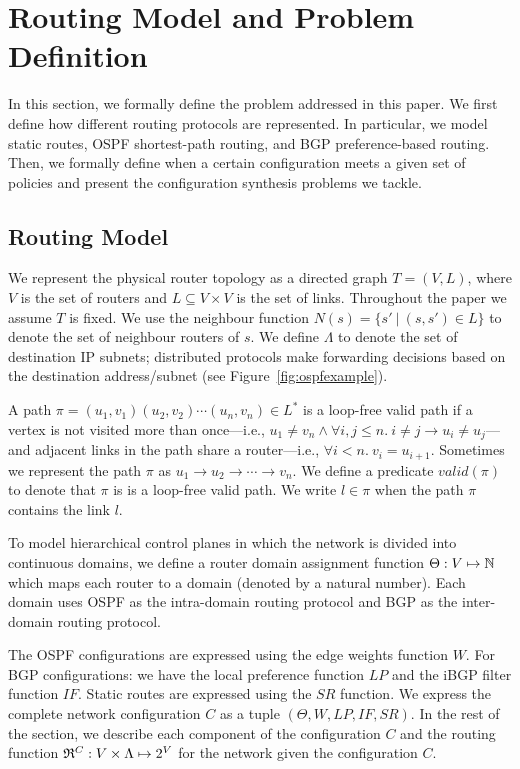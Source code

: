 \section{Routing Model and Problem Definition}
In this section, we formally define the problem addressed in this
paper.  We first define how different
routing protocols are represented.  In particular, we model static
routes, OSPF shortest-path routing, and BGP preference-based routing.
Then, we formally define when a certain configuration meets a given
set of policies and present the configuration synthesis problems
we tackle.

\subsection{Routing Model}

We represent the physical router topology as a directed graph $T=(V, L)$,
where $V$ is the set of routers and $L\subseteq V\times V$ is the set of links. 
Throughout the paper we assume $T$ is fixed.
We use the neighbour function $N(s) = \{s'\ | \ (s,s') \in L \}$ to denote 
the set of neighbour routers of $s$. 
We define $\Lambda$ to denote the set of destination IP subnets;
distributed protocols make forwarding decisions based on the 
destination address/subnet (see Figure~\ref{fig:ospfexample}).

A path $\pi = (u_1,v_1) (u_2, v_2) \cdots (u_n, v_n) \in L^*$ is a loop-free valid path if
a  vertex is not visited more than once---i.e.,
$u_1\neq v_n\wedge\forall i,j \leq n. 
~i \not= j \rightarrow u_i \not= u_j$---and adjacent links in the
path share a router---i.e., $\forall i < n. ~v_i = u_{i+1}$.
Sometimes we represent the path $\pi$ as $u_1\rightarrow u_2 \rightarrow  \cdots \rightarrow v_n$.
We define a predicate $valid(\pi)$ to denote that $\pi$ is 
is a loop-free valid path. 
We write $l \in \pi$ when the path $\pi$ contains the link $l$. 

To model hierarchical control planes in which
 the network is divided into continuous domains,
we define a router domain assignment function
$\Theta: V \mapsto \mathbb{N}$ which maps each router to a domain 
(denoted by a natural number).
Each domain uses OSPF as the intra-domain routing protocol
and BGP as the inter-domain routing protocol. 


The OSPF configurations are expressed 
using the edge weights function $W$. 
For BGP configurations: 
we have the local preference function $LP$ 
and the iBGP filter function $IF$. Static 
routes are expressed using the $SR$ function.
We express the complete network configuration $C$
as a tuple $(\Theta,W,LP,IF,SR)$.  In the 
rest of the section, we describe each component 
of the configuration $C$ and the routing function 
$\mathfrak{R}^C: V \times \Lambda \mapsto 2^V$ for 
the network given the configuration $C$. 


